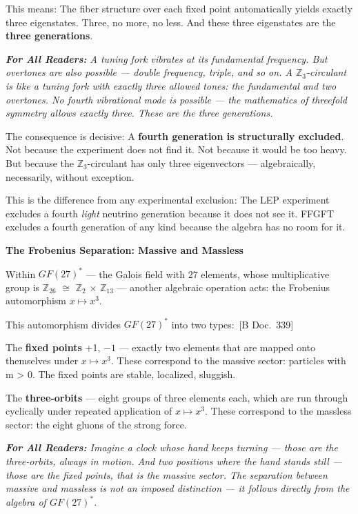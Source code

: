 \documentclass[11pt,oneside]{book}
\newcommand{\status}[1]{\penalty10000\,{\scriptsize\textcolor{gray!60}{[#1]}}}
\newenvironment{laierspur}{%
  \par\vspace{4pt}%
  \noindent\small\itshape\color{blue!60!black}%
  \textbf{For All Readers:}\enspace\ignorespaces}{%
  \par\vspace{4pt}\normalsize\normalfont\normalcolor}
\begin{document}
This means: The fiber structure over each fixed point automatically yields
exactly three eigenstates. Three, no more, no less. And these three
eigenstates are the \textbf{three generations}.

\begin{laierspur}
A tuning fork vibrates at its fundamental frequency. But overtones are
also possible — double frequency, triple, and so on. A $\mathbb{Z}_3$-circulant is
like a tuning fork with exactly three allowed tones: the fundamental and two
overtones. No fourth vibrational mode is possible — the mathematics of
threefold symmetry allows exactly three. These are the three generations.
\end{laierspur}

The consequence is decisive: A \textbf{fourth generation is structurally
excluded}. Not because the experiment does not find it. Not because it would
be too heavy. But because the $\mathbb{Z}_3$-circulant has only three eigenvectors —
algebraically, necessarily, without exception.

This is the difference from any experimental exclusion: The LEP experiment
excludes a fourth \textit{light} neutrino generation because it does not see it.
FFGFT excludes a fourth generation of any kind because the algebra has no
room for it.

\textbf{The Frobenius Separation: Massive and Massless}

Within $GF(27)^*$ — the Galois field with 27 elements, whose multiplicative
group is $\mathbb{Z}_{26}$ $\cong$ $\mathbb{Z}_2$ $\times$ $\mathbb{Z}_{13}$ — another algebraic operation acts:
the Frobenius automorphism $x \mapsto x^3$.

This automorphism divides $GF(27)^*$ into two types: \status{B Doc.~339}

The \textbf{fixed points} {+1, $-1$} — exactly two elements that are mapped onto
themselves under $x \mapsto x^3$. These correspond to the massive sector: particles
with m > 0. The fixed points are stable, localized, sluggish.

The \textbf{three-orbits} — eight groups of three elements each, which are run
through cyclically under repeated application of $x \mapsto x^3$. These
correspond to the massless sector: the eight gluons of the strong force.

\begin{laierspur}
Imagine a clock whose hand keeps turning — those are the three-orbits,
always in motion. And two positions where the hand stands still — those are
the fixed points, that is the massive sector. The separation between massive
and massless is not an imposed distinction — it follows directly from the
algebra of $GF(27)^*$.
\end{laierspur}
\end{document}
